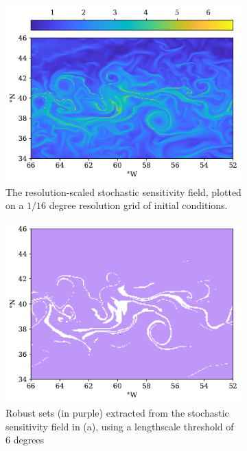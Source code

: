 \begin{figure}
	\begin{center}
		\begin{subfigure}{0.8\textwidth}
			\includegraphics[width=\textwidth]{chp02_background/figures/res_scaled_stoch_sens_high_res.pdf}
			\caption{The resolution-scaled stochastic sensitivity field, plotted on a \(1/16\) degree resolution grid of initial conditions.}
			\label{fig:s2_na_ex_field}
		\end{subfigure}
		\begin{subfigure}{0.8\textwidth}
			\includegraphics[width=\textwidth]{chp02_background/figures/robust_3.0_high_res.pdf}
			\caption{Robust sets (in purple) extracted from the stochastic sensitivity field in (a), using a lengthscale threshold of \(6\) degrees}
			\label{fig:s2_na_ex_sets}
		\end{subfigure}
		\caption{}
		\label{fig:fig:s2_na_ex}
	\end{center}
\end{figure}



